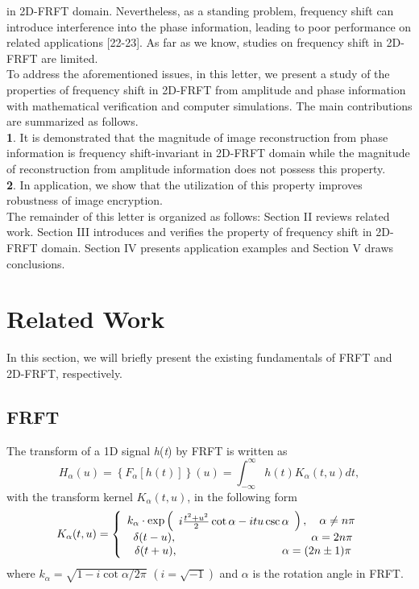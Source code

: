 \documentclass[journal]{IEEEtran}
\begin{document}
in 2D-FRFT domain. Nevertheless, as a standing problem, frequency shift can introduce interference into the phase information, leading to poor performance on related applications [22-23]. As far as we know, studies on frequency shift in 2D-FRFT are limited.\\\indent To address the aforementioned issues, in this letter, we present a study of the properties of frequency shift in 2D-FRFT from amplitude and phase information with mathematical verification and computer simulations. The main contributions are summarized as follows.\\
\textbf{1}. It is demonstrated that the magnitude of image reconstruction from phase information is frequency shift-invariant in 2D-FRFT domain while the magnitude of reconstruction from amplitude information does not possess this property.\\
\textbf{2}. In application, we show that the utilization of this property improves robustness of image encryption.\\\indent The remainder of this letter is organized as follows: Section II reviews related work. Section III introduces and verifies the property of frequency shift in 2D-FRFT domain. Section IV presents application examples and Section V draws conclusions.
\section{Related Work}
In this section, we will briefly present the existing fundamentals of FRFT and 2D-FRFT, respectively.
\subsection{FRFT}
The transform of a 1D signal \emph{h}(\emph{t}) by FRFT is written as
\begin{equation}
{H_\alpha }\left( u \right) = \left\{ {{F_\alpha }\left[ {h\left( t \right)} \right]} \right\}\left( u \right) = \int_{ - \infty }^\infty  {h\left( t \right){K_\alpha }\left( {t,u} \right)dt,}
\end{equation}
with the transform kernel $ {{K_\alpha }\left( {t,u} \right)}$, in the following form
\begin{equation}
{K_\alpha }(t,u) =\left\{{\begin{array}{*{20}{c}}{{k_\alpha}\cdot \exp \left( {\begin{array}{*{20}{c}}
{i\frac{{{t^2} + {u^2}}}{2}\cot \alpha  - itu\csc \alpha}  \\
\end{array}} \right), \quad \alpha  \ne n\pi }  \\\
{\delta (t - u),\quad \quad \quad \quad \quad \quad \quad \quad \quad \quad \quad \quad {\rm{  }}\alpha  = 2n\pi }  \\\
{\delta (t + u),\quad \;\quad \quad \quad \quad \quad \quad \quad \quad {\rm{  }}\alpha  = (2n \pm 1)\pi }  \\
\end{array}} \right.
\end{equation}
where ${k_\alpha } = \sqrt {1 - i\cot \alpha /2\pi }$ $ (i = \sqrt {-1})$ and $ \alpha $ is the rotation angle in FRFT.
\end{document}
